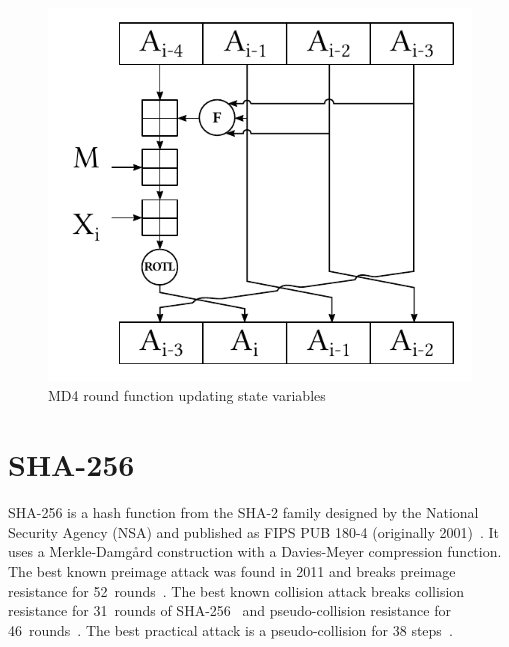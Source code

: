 \begin{figure}[ht]
  \begin{center}
    \includegraphics{img/md4.pdf}
    \caption{MD4 round function updating state variables}
    \label{fig:md4-round-function}
  \end{center}
\end{figure}











\section{SHA-256}
\label{sec:dc-sha-256}
%
SHA-256 is a hash function from the SHA-2 family designed by the National Security Agency (NSA)
and published as FIPS PUB 180-4 (originally 2001)~\cite{fips-pub-180-4}.
It uses a Merkle-Damg\aa{}rd construction with a Davies-Meyer compression function.
The best known preimage attack was found in 2011
and breaks preimage resistance for 52~rounds~\cite{bicliques}. The best known collision attack
breaks collision resistance for 31~rounds of SHA-256~\cite{improving} and pseudo-collision
resistance for 46~rounds~\cite{high2011}. The best practical attack is a pseudo-collision
for 38 steps~\cite{mendel2013improving}.

